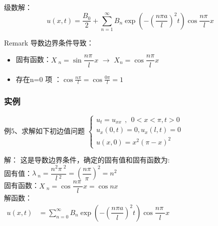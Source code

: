 \begin{frame}
	\frametitle{}
	级数解：
	\begin{equation*}
		u(x,t)=\frac{B_0 }{2}+ \sum\limits_{n=1}^{\infty } B_n  \exp(-(\frac{n\pi a}{l})^2 t) \cos \frac{n\pi~}{l} x
	\end{equation*}	
	\begin{block} {Remark }
		导数边界条件导致：
		\begin{itemize}
			\item  固有函数：$X~_n=\sin \dfrac{n\pi~}{l} x$ $\to$ 	$X_n=\cos \dfrac{n\pi}{l} x$
			\item 	存在n=0 项 ：$\cos \frac{n\pi}{l} = \cos \frac{0\pi}{l} =1$
		\end{itemize}
	\end{block}
\end{frame}	

\begin{frame}
	\frametitle{实例}
	\begin{exampleblock} {例5、求解如下初边值问题}
	$\displaystyle  \begin{cases}
		u_{t} =u_{xx} ~~,~~ 0<x<\pi, t>0\\
		u_x (0,t) =0, u_x (l,t)=0 \\
		u(x,0) =x^2 (\pi-x)^2
	\end{cases}$ \\	
	\end{exampleblock}
	\alert{解：} 	
	这是导数边界条件，确定的固有值和固有函数为:\\
	固有值：$\displaystyle  \lambda~_n=\dfrac{n^2\pi~^2}{l~^2 }= (\dfrac{n\pi }{\pi}) ^2 = n^2$ \\ 
	固有函数：$\displaystyle  X~_n=\cos \dfrac{n\pi~}{l} x=\cos nx $\\
	解函数：\\ 
	$\displaystyle \begin{array}{llll}
		u(x,t)&=  \sum\limits_{n=0}^{\infty } B_n  \exp(-(\dfrac{n\pi a}{l})^2 t) \cos \dfrac{n\pi~}{l} x\\
	\end{array}$ \\ 	
\end{frame}	

